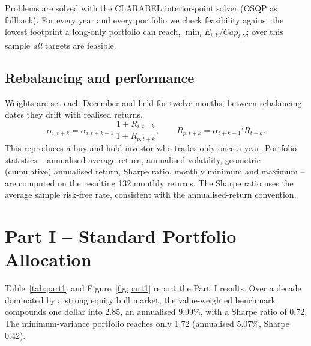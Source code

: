 \documentclass[11pt,a4paper]{article}
\begin{document}
Problems are solved with the CLARABEL interior-point solver (OSQP as fallback).
For every year and every portfolio we check feasibility against the lowest
footprint a long-only portfolio can reach, $\min_i E_{i,Y}/Cap_{i,Y}$; over this
sample \emph{all} targets are feasible.

\subsection{Rebalancing and performance}

Weights are set each December and held for twelve months; between rebalancing
dates they drift with realised returns,
\begin{equation}
\alpha_{i,t+k}=\alpha_{i,t+k-1}\,\frac{1+R_{i,t+k}}{1+R_{p,t+k}},
\qquad
R_{p,t+k}=\alpha_{t+k-1}'R_{t+k}.
\end{equation}
This reproduces a buy-and-hold investor who trades only once a year. Portfolio
statistics -- annualised average return, annualised volatility, geometric
(cumulative) annualised return, Sharpe ratio, monthly minimum and maximum -- are
computed on the resulting 132 monthly returns. The Sharpe ratio uses the
average sample risk-free rate, consistent with the annualised-return convention.

\section{Part I -- Standard Portfolio Allocation}

Table~\ref{tab:part1} and Figure~\ref{fig:part1} report the Part~I results.
Over a decade dominated by a strong equity bull market, the value-weighted
benchmark compounds one dollar into 2.85, an annualised 9.99\%, with a Sharpe
ratio of 0.72. The minimum-variance portfolio reaches only 1.72
(annualised 5.07\%, Sharpe 0.42).
\end{document}

